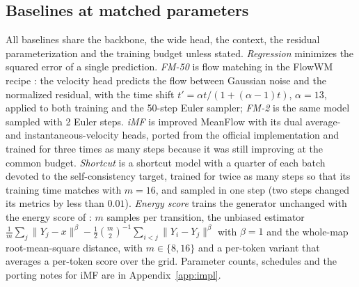 \subsection{Baselines at matched parameters}
\label{sec:baselines}
All baselines share the backbone, the wide head, the context, the residual parameterization and the training budget unless stated. \emph{Regression} minimizes the squared error of a single prediction. \emph{FM-50} is flow matching in the FlowWM recipe \citep{lipman2023flow,porcher2026flowwm}: the velocity head predicts the flow between Gaussian noise and the normalized residual, with the time shift $t' = \alpha t/(1 + (\alpha-1)t)$, $\alpha = 13$, applied to both training and the 50-step Euler sampler; \emph{FM-2} is the same model sampled with 2 Euler steps. \emph{iMF} is improved MeanFlow \citep{geng2025meanflow,geng2025imf} with its dual average- and instantaneous-velocity heads, ported from the official implementation and trained for three times as many steps because it was still improving at the common budget. \emph{Shortcut} is a shortcut model \citep{frans2025shortcut} with a quarter of each batch devoted to the self-consistency target, trained for twice as many steps so that its training time matches \imlewm{} with $m{=}16$, and sampled in one step (two steps changed its metrics by less than $0.01$). \emph{Energy score} trains the \imlewm{} generator unchanged with the energy score of \citet{makabe2026esp}: $m$ samples per transition, the unbiased estimator $\frac{1}{m}\sum_j \|Y_j - x\|^\beta - \frac{1}{2}\binom{m}{2}^{-1}\sum_{i<j}\|Y_i - Y_j\|^\beta$ with $\beta = 1$ and the whole-map root-mean-square distance, with $m \in \{8, 16\}$ and a per-token variant that averages a per-token score over the grid. Parameter counts, schedules and the porting notes for iMF are in Appendix~\ref{app:impl}.
